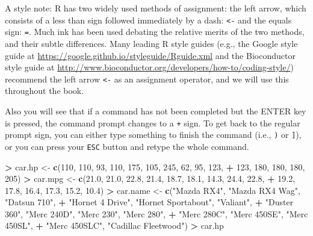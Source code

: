 \documentclass[]{krantz}
\makeatletter
\newenvironment{Shaded}{\begin{snugshade}}{\end{snugshade}}
\newcommand{\DecValTok}[1]{\textcolor[rgb]{0.06,0.06,0.06}{#1}}
\newcommand{\FloatTok}[1]{\textcolor[rgb]{0.06,0.06,0.06}{#1}}
\newcommand{\KeywordTok}[1]{\textcolor[rgb]{0.27,0.27,0.27}{\textbf{#1}}}
\newcommand{\NormalTok}[1]{#1}
\newcommand{\OperatorTok}[1]{\textcolor[rgb]{0.43,0.43,0.43}{\textbf{#1}}}
\newcommand{\StringTok}[1]{\textcolor[rgb]{0.5,0.5,0.5}{#1}}
\newenvironment{kframe}{%
\medskip{}
\setlength{\fboxsep}{.8em}
 \def\at@end@of@kframe{}%
 \ifinner\ifhmode%
  \def\at@end@of@kframe{\end{minipage}}%
  \begin{minipage}{\columnwidth}%
 \fi\fi%
 \def\FrameCommand##1{\hskip\@totalleftmargin \hskip-\fboxsep
 \colorbox{shadecolor}{##1}\hskip-\fboxsep
     \hskip-\linewidth \hskip-\@totalleftmargin \hskip\columnwidth}%
 \MakeFramed {\advance\hsize-\width
   \@totalleftmargin\z@ \linewidth\hsize
   \@setminipage}}%
 {\par\unskip\endMakeFramed%
 \at@end@of@kframe}
\renewenvironment{Shaded}{\begin{kframe}}{\end{kframe}}
\makeatother
\begin{document}
A style note: R has two widely used methods of assignment: the left arrow, which consists of a less than sign followed immediately by a dash: \texttt{\textless{}-} and the equals sign: \texttt{=}. Much ink has been used debating the relative merits of the two methods, and their subtle differences. Many leading R style guides (e.g., the Google style guide at \url{https://google.github.io/styleguide/Rguide.xml} and the Bioconductor style guide at \url{http://www.bioconductor.org/developers/how-to/coding-style/}) recommend the left arrow \texttt{\textless{}-} as an assignment operator, and we will use this throughout the book.

Also you will see that if a command has not been completed but the ENTER key is pressed, the command prompt changes to a \texttt{+} sign. To get back to the regular prompt sign, you can either type something to finish the command (i.e., \texttt{)} or \texttt{{]}}), or you can press your \texttt{ESC} button and retype the whole command.

\begin{Shaded}
\begin{Highlighting}[]
\OperatorTok{>}\StringTok{ }\NormalTok{car.hp <-}\StringTok{ }\KeywordTok{c}\NormalTok{(}\DecValTok{110}\NormalTok{, }\DecValTok{110}\NormalTok{, }\DecValTok{93}\NormalTok{, }\DecValTok{110}\NormalTok{, }\DecValTok{175}\NormalTok{, }\DecValTok{105}\NormalTok{, }\DecValTok{245}\NormalTok{, }\DecValTok{62}\NormalTok{, }\DecValTok{95}\NormalTok{, }\DecValTok{123}\NormalTok{, }
\OperatorTok{+}\StringTok{ }\DecValTok{123}\NormalTok{, }\DecValTok{180}\NormalTok{, }\DecValTok{180}\NormalTok{, }\DecValTok{180}\NormalTok{, }\DecValTok{205}\NormalTok{)}
\OperatorTok{>}\StringTok{ }\NormalTok{car.mpg <-}\StringTok{ }\KeywordTok{c}\NormalTok{(}\FloatTok{21.0}\NormalTok{, }\FloatTok{21.0}\NormalTok{, }\FloatTok{22.8}\NormalTok{, }\FloatTok{21.4}\NormalTok{, }\FloatTok{18.7}\NormalTok{, }\FloatTok{18.1}\NormalTok{, }\FloatTok{14.3}\NormalTok{, }\FloatTok{24.4}\NormalTok{, }\FloatTok{22.8}\NormalTok{, }
\OperatorTok{+}\StringTok{              }\FloatTok{19.2}\NormalTok{, }\FloatTok{17.8}\NormalTok{, }\FloatTok{16.4}\NormalTok{, }\FloatTok{17.3}\NormalTok{, }\FloatTok{15.2}\NormalTok{, }\FloatTok{10.4}\NormalTok{)}
\OperatorTok{>}\StringTok{ }\NormalTok{car.name <-}\StringTok{ }\KeywordTok{c}\NormalTok{(}\StringTok{"Mazda RX4"}\NormalTok{, }\StringTok{"Mazda RX4 Wag"}\NormalTok{, }\StringTok{"Datsun 710"}\NormalTok{, }
\OperatorTok{+}\StringTok{               "Hornet 4 Drive"}\NormalTok{, }\StringTok{"Hornet Sportabout"}\NormalTok{, }\StringTok{"Valiant"}\NormalTok{, }
\OperatorTok{+}\StringTok{               "Duster 360"}\NormalTok{, }\StringTok{"Merc 240D"}\NormalTok{, }\StringTok{"Merc 230"}\NormalTok{, }\StringTok{"Merc 280"}\NormalTok{, }
\OperatorTok{+}\StringTok{               "Merc 280C"}\NormalTok{, }\StringTok{"Merc 450SE"}\NormalTok{, }\StringTok{"Merc 450SL"}\NormalTok{, }
\OperatorTok{+}\StringTok{               "Merc 450SLC"}\NormalTok{, }\StringTok{"Cadillac Fleetwood"}\NormalTok{)}
\OperatorTok{>}\StringTok{ }\NormalTok{car.hp}
\end{Highlighting}
\end{Shaded}
\end{document}
